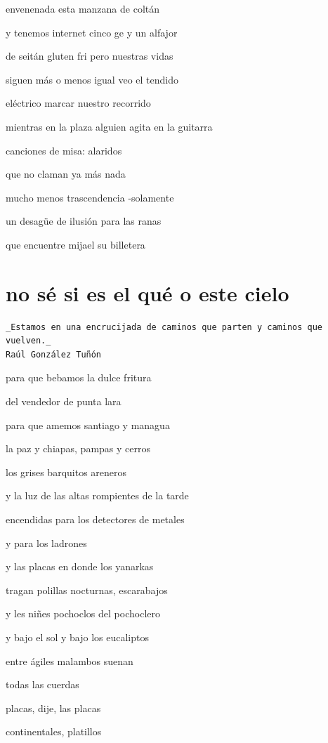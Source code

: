 \documentclass[
]{book}
\begin{document}
envenenada esta manzana de coltán

y tenemos internet cinco ge y un alfajor

de seitán gluten fri pero nuestras vidas

siguen más o menos igual veo el tendido

eléctrico marcar nuestro recorrido

mientras en la plaza alguien agita en la guitarra

canciones de misa: alaridos

que no claman ya más nada

mucho menos trascendencia -solamente

un desagüe de ilusión para las ranas

que encuentre mijael su billetera

\hypertarget{no-suxe9-si-es-el-quuxe9-o-este-cielo}{%
\chapter{no sé si es el qué o este cielo}\label{no-suxe9-si-es-el-quuxe9-o-este-cielo}}

\begin{verbatim}
_Estamos en una encrucijada de caminos que parten y caminos que vuelven._
Raúl González Tuñón
\end{verbatim}

para que bebamos la dulce fritura

del vendedor de punta lara

para que amemos santiago y managua

la paz y chiapas, pampas y cerros

los grises barquitos areneros

y la luz de las altas rompientes de la tarde

encendidas para los detectores de metales

y para los ladrones

y las placas en donde los yanarkas

tragan polillas nocturnas, escarabajos

y les niñes pochoclos del pochoclero

y bajo el sol y bajo los eucaliptos

entre ágiles malambos suenan

todas las cuerdas

placas, dije, las placas

continentales, platillos
\end{document}

